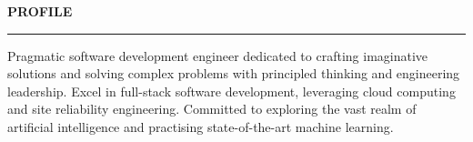 \documentclass{cv}
\begin{document}
\medskip

 \textbf{PROFILE}
\sectionlineskip
\hrule

Pragmatic software development engineer dedicated to crafting imaginative solutions and solving complex problems with principled thinking and engineering leadership. Excel in full-stack software development, leveraging cloud computing and site reliability engineering. Committed to exploring the vast realm of artificial intelligence and practising state-of-the-art machine learning.

    
\end{document}
